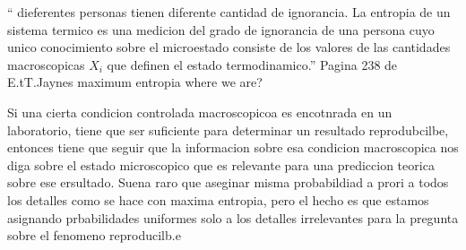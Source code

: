 \documentclass[20pt]{extarticle}
\begin{document}
“ dieferentes personas tienen diferente cantidad de ignorancia. La entropia de un sistema termico es una medicion del grado de ignorancia de una persona cuyo unico conocimiento sobre el microestado consiste de los valores de las cantidades macroscopicas $X_i$ que definen el estado termodinamico.” Pagina 238 de E.tT.Jaynes maximum entropia where we are?

Si una cierta condicion controlada macroscopicoa es encotnrada en un laboratorio, tiene que ser suficiente para determinar un resultado reprodubcilbe, entonces tiene que seguir que la informacion sobre esa condicion macroscopica nos diga sobre el estado microscopico que es relevante para una prediccion teorica sobre ese ersultado.
Suena raro que aseginar misma probabildiad a prori a todos los detalles como se hace con maxima entropia, pero el hecho es que estamos asignando prbabilidades uniformes solo a los detalles irrelevantes para la pregunta sobre el fenomeno reproducilb.e
\end{document}
